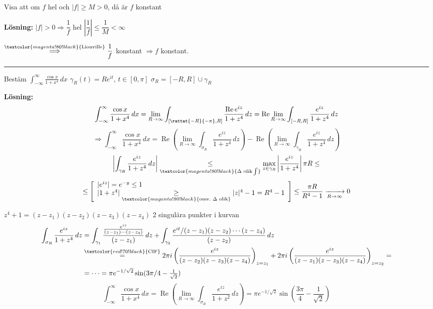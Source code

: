  \quad Visa att om $f$ hel och $|f| \ge M > 0$, då är $f$ konstant

\textbf{Lösning:} $|f| > 0 \Rightarrow \dfrac{1}{f}$ hel \quad $\left| \dfrac{1}{f} \right| \le \dfrac{1}{M} < \infty$

$\overset{\textcolor{magenta!80!black}{\text{Liouville}}}{\Longrightarrow} \dfrac{1}{f}$ konstant $\Rightarrow f$ konstant.

\noindent\rule{\linewidth}{0.4pt}

 \quad Bestäm $\displaystyle\int_{-\infty}^{\infty} \frac{\cos x}{1 + x^4}\,dx$ \qquad $\gamma_R(t) = Re^{it}$, $t \in [0, \pi]$ \quad $\sigma_R = [-R, R] \cup \gamma_R$

\textbf{Lösning:}
\[ \int_{-\infty}^{\infty} \frac{\cos x}{1 + x^4}\,dx = \lim_{R \to \infty} \int_{[\rattat{-R}{-\pi}, R]} \frac{\operatorname{Re} e^{iz}}{1 + z^4}\,dz = \operatorname{Re} \lim_{R \to \infty} \int_{[-R, R]} \frac{e^{iz}}{1 + z^4}\,dz \]
\[ \Rightarrow \int_{-\infty}^{\infty} \frac{\cos x}{1 + x^4}\,dx = \operatorname{Re}\left( \lim_{R \to \infty} \int_{\sigma_R} \frac{e^{iz}}{1 + z^4}\,dz \right) - \operatorname{Re}\left( \lim_{R \to \infty} \int_{\gamma_R} \frac{e^{iz}}{1 + z^4}\,dz \right) \]
\[ \left| \int_{\gamma_R} \frac{e^{iz}}{1 + z^4}\,dz \right| \underset{\textcolor{magenta!80!black}{\Delta\text{ olik} \int}}{\le} \max_{z \in \gamma_R} \left| \frac{e^{iz}}{1 + z^4} \right| \pi R \le \]
\[ \le \left[ \begin{array}{l} |e^{iz}| = e^{-y} \le 1 \\ |1 + z^4| \underset{\textcolor{magenta!80!black}{\text{omv.\ } \Delta \text{ olik}}}{\ge} |z|^4 - 1 = R^4 - 1 \end{array} \right] \le \frac{\pi R}{R^4 - 1} \xrightarrow[R \to \infty]{} 0 \]

$z^4 + 1 = (z - z_1)(z - z_2)(z - z_3)(z - z_4)$
\textcolor{magenta!80!black}{2 singulära punkter i kurvan}
\begin{align*}
  \int_{\sigma_R} \frac{e^{iz}}{1 + z^4}\,dz &= \int_{\gamma_1} \frac{\frac{e^{iz}}{(z - z_1) \cdots (z - z_4)}}{(z - z_1)}\,dz + \int_{\gamma_2} \frac{e^{it}/(z - z_1)(z - z_2) \cdots (z - z_4)}{(z - z_2)}\,dz \\
  &\overset{\textcolor{red!70!black}{\text{CIF}}}{=} 2\pi i \left( \frac{e^{iz}}{(z - z_2)(z - z_3)(z - z_4)} \right)_{z = z_1} + 2\pi i \left( \frac{e^{iz}}{(z - z_1)(z - z_3)(z - z_4)} \right)_{z = z_2} = \\
  &= \dots = \pi e^{-1/\sqrt{2}} \sin(3\pi/4 - \tfrac{1}{\sqrt{2}})
\end{align*}
\[ \int_{-\infty}^{\infty} \frac{\cos x}{1 + x^4}\,dx = \operatorname{Re}\left( \lim_{R \to \infty} \int_{\sigma_R} \frac{e^{iz}}{1 + z^2}\,dz \right) = \pi e^{-1/\sqrt{2}} \sin\left( \frac{3\pi}{4} - \frac{1}{\sqrt{2}} \right) \]
